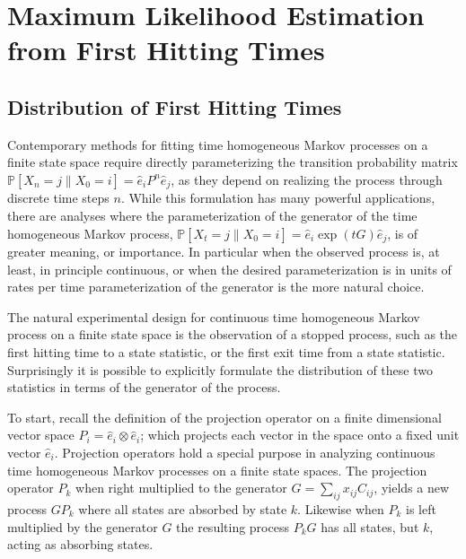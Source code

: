 \chapter{Maximum Likelihood Estimation from First Hitting Times}
\section{Distribution of First Hitting Times}
Contemporary methods for fitting time homogeneous Markov processes on a finite 
state space require directly parameterizing the transition probability matrix $\mathbb{P}\left[X_n = j \left\|X_0 = i \right.\right] = \hat{e}_i P^n \hat{e}_j$,
as they depend on realizing the process through discrete time steps $n$. While this 
formulation has many powerful applications, there are analyses where the parameterization of 
the generator of the time homogeneous Markov process, $\mathbb{P}\left[X_t = j \left\|X_0 = i \right.\right] = \hat{e}_i \exp\left({tG}\right) \hat{e}_j$, 
is of greater meaning, or importance. In particular when the observed process is, at least,
in principle continuous, or when the desired parameterization is in units of rates per time
parameterization of the generator is the more natural choice.

The natural experimental design for continuous time homogeneous Markov process on a finite
state space is the observation of a stopped process, such as the first hitting time to a
state statistic, or the first exit time from a state statistic. Surprisingly it is possible
to explicitly formulate the distribution of these two statistics in terms of the generator
of the process.

To start, recall the definition of the projection operator on a finite dimensional vector
space $P_i = \hat{e}_i \otimes \hat{e}_i$; which projects each vector in the space onto a
fixed unit vector $\hat{e}_i$. Projection operators hold a special purpose in analyzing
continuous time homogeneous Markov processes on a finite state spaces. The projection
operator $P_k$ when right multiplied to the generator $G = \sum_{ij}x_{ij}C_{ij}$, yields a
new process $GP_k$ where all states are absorbed by state $k$. Likewise when $P_k$ is left
multiplied by the generator $G$ the resulting process $P_kG$ has all states, but $k$, acting as
absorbing states.



